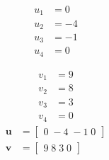 \[\begin{aligned}
u_{1} &= 0 \\
u_{2} &= -4 \\
u_{3} &= -1 \\
u_{4} &= 0 
\end{aligned}\]

\[\begin{aligned}
v_{1} &= 9 \\
v_{2} &= 8 \\
v_{3} &= 3 \\
v_{4} &= 0 
\end{aligned}\]
\[\begin{aligned}
\mathbf{u} &= \begin{bmatrix}0\;-4\;-1\;0\end{bmatrix} \\
\mathbf{v} &= \begin{bmatrix}9\;8\;3\;0\end{bmatrix}
\end{aligned}\]

